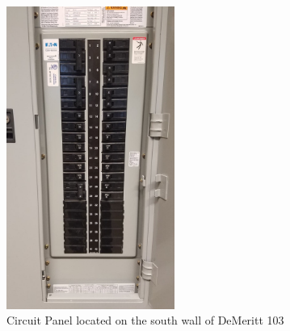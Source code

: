 \documentclass[12pt,epsfig]{article}
\begin{document}
\begin{figure}
\begin{center}
\includegraphics[angle=0,width=0.49\textwidth]{CP}
\caption{\label{ANCHOR} Circuit Panel located on the south wall of DeMeritt 103 }
\end{center}
\end{figure}
\end{document}
